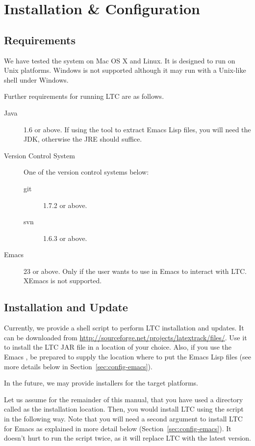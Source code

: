 \chapter{Installation \& Configuration} \label{ch:install}

\section{Requirements}

We have tested the system on Mac OS X and Linux. It is designed to run on Unix platforms. Windows is not supported although it may run with a Unix-like shell under Windows.

Further requirements for running LTC are as follows.
\begin{description}
\item[Java] 1.6 or above.  If using the  tool to extract Emacs Lisp files, you will need the JDK, otherwise the JRE should suffice.
\item[Version Control System]  One of the version control systems below:
  \begin{description}
  \item[git] 1.7.2 or above.
  \item[svn] 1.6.3 or above.
  \end{description}
\item[Emacs] 23 or above.  Only if the user wants to use  in Emacs to interact with LTC.  XEmacs is not supported.
\end{description}

\section{Installation and Update}

Currently, we provide a shell script  to perform LTC installation and updates.  It can be downloaded from \url{http://sourceforge.net/projects/latextrack/files/}.  Use it to install the LTC JAR file in a location of your choice.  Also, if you use the Emacs , be prepared to supply the location where to put the Emacs Lisp files (see more details below in Section~\ref{sec:config-emacs}).

In the future, we may provide installers for the target platforms.

Let us assume for the remainder of this manual, that you have used a directory called  as the installation location. Then, you would install LTC using the script in the following way.  Note that you will need a second argument to install LTC for Emacs as explained in more detail below (Section~\ref{sec:config-emacs}).  It doesn't hurt to run the script twice, as it will replace LTC with the latest version.


